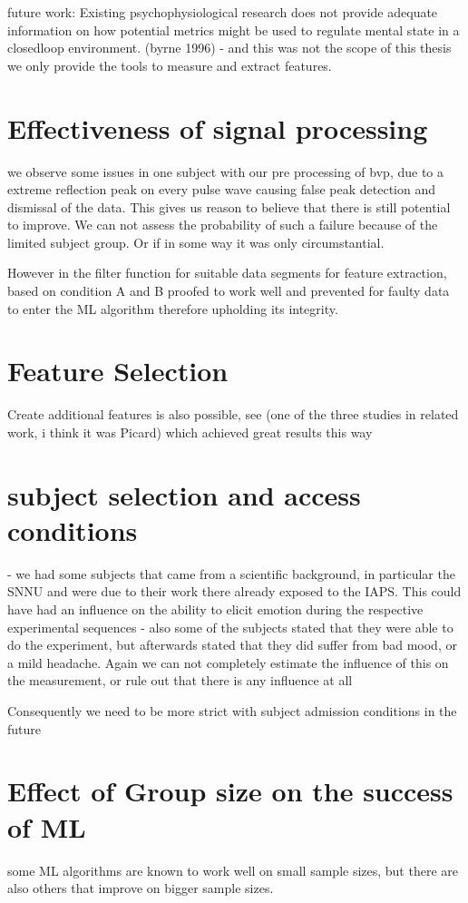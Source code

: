 

future work: Existing psychophysiological research does not provide adequate information
on how potential metrics might be used to regulate mental state in a closedloop
environment. (byrne 1996)
- and this was not the scope of this thesis we only provide the tools to measure and extract features.

\section{Effectiveness of signal processing}
we observe some issues in one subject with our pre processing of bvp, due to a extreme reflection peak on every pulse wave causing false peak detection and dismissal of the data. This gives us reason to believe that there is still potential to improve. We can not assess the probability of such a failure because of the limited subject group. Or if in some way it was only circumstantial.

However in the filter function for suitable data segments for feature extraction, based on condition A and B proofed to work well and prevented for faulty data to enter the ML algorithm therefore upholding its integrity.
\section{Feature Selection}
Create additional features is also possible, see (one of the three studies in related work, i think it was Picard) which achieved great results this way
\section{subject selection and access conditions}
- we had some subjects that came from a scientific background, in particular the SNNU and were due to their work there already exposed to the IAPS. This could have had an influence on the ability to elicit emotion during the respective experimental sequences 
- also some of the subjects stated that they were able to do the experiment, but afterwards stated that they did suffer from bad mood, or a mild headache. Again we can not completely estimate the influence of this on the measurement, or rule out that there is any influence at all

Consequently we need to be more strict with subject admission conditions in the future

\section{Effect of Group size on the success of ML}
some ML algorithms are known to work well on small sample sizes, but there are also others that improve on bigger sample sizes.

